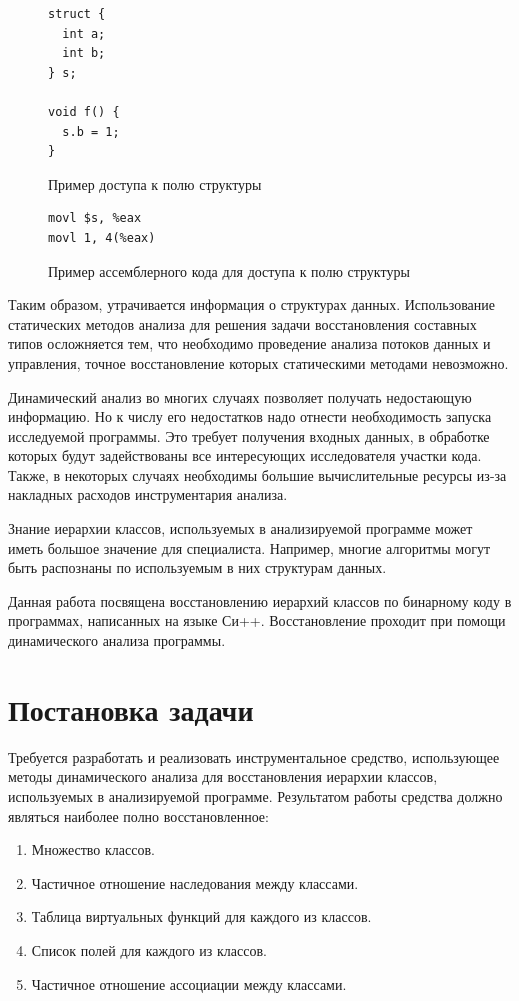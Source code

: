 \documentclass[a4paper,12pt,russian]{article}
\begin{document}
\begin{figure}
\begin{lstlisting}
struct {
  int a;
  int b;
} s;

void f() {
  s.b = 1;
}
\end{lstlisting}
\caption{Пример доступа к полю структуры}
\label{field_ref_lst}
\end{figure}

\begin{figure}
\begin{lstlisting}[language={[x86masm]Assembler}]
movl $s, %eax
movl 1, 4(%eax)
\end{lstlisting}
\caption{Пример ассемблерного кода для доступа к полю структуры}
\label{field_ref_asm_lst}
\end{figure}

Таким образом, утрачивается информация о структурах данных.
Использование статических методов анализа для решения задачи восстановления составных типов осложняется тем, что необходимо проведение анализа потоков данных и управления, точное восстановление которых статическими методами невозможно.

Динамический анализ во многих случаях позволяет получать недостающую информацию. Но к числу его недостатков надо отнести необходимость запуска исследуемой программы.
Это требует получения входных данных, в обработке которых будут задействованы все интересующих исследователя участки кода.
Также, в некоторых случаях необходимы большие вычислительные ресурсы из-за накладных расходов инструментария анализа.

Знание иерархии классов, используемых в анализируемой программе может иметь большое значение для специалиста. Например, многие алгоритмы могут быть распознаны по используемым в них структурам данных.

Данная работа посвящена восстановлению иерархий классов по бинарному коду в программах, написанных на языке Си++.
Восстановление проходит при помощи динамического анализа программы.

\newpage
\section{Постановка задачи}
Требуется разработать и реализовать инструментальное средство, использующее методы динамического анализа для восстановления иерархии классов, используемых в анализируемой программе.
Результатом работы средства должно являться наиболее полно восстановленное:
\begin{enumerate}
\item Множество классов.
\item Частичное отношение наследования между классами.
\item Таблица виртуальных функций для каждого из классов.
\item Список полей для каждого из классов.
\item Частичное отношение ассоциации между классами.
\end{enumerate}
\end{document}
